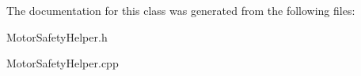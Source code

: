 The documentation for this class was generated from the following files:\begin{DoxyCompactItemize}
\item 
MotorSafetyHelper.h\item 
MotorSafetyHelper.cpp\end{DoxyCompactItemize}
